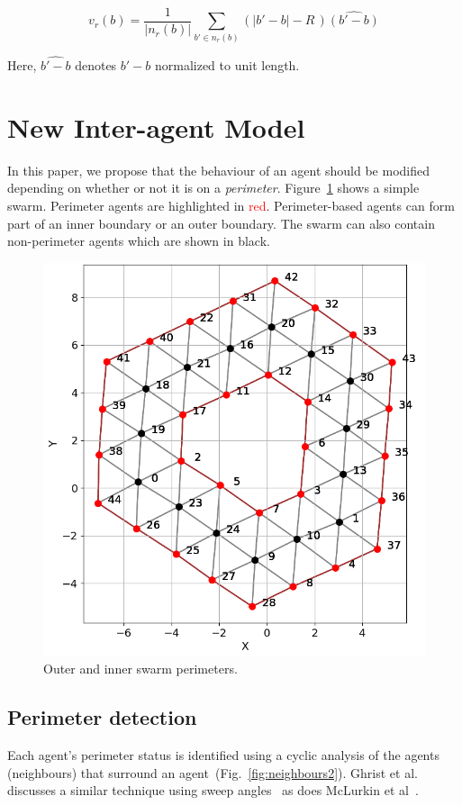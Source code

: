 \documentclass[12pt,a4paper]{IEEEtran}
\newcommand{\card}[1]{\vert{#1}\vert}
\newcommand{\vbb}[2]{#2-#1}
\begin{document}
\begin{equation}\label{eq:repulsion2a}
v_r(b) = \frac{1}{\card{n_r(b)}}\sum_{b' \in n_r(b)} \left(\card{\vbb{b}{b'}} - R \, \right)\widehat{\left(\vbb{b}{b'}\right)}
\end{equation}

Here, $\widehat{\vbb{b}{b'}}$ denotes $\vbb{b}{b'}$ normalized to unit length.

\section{New Inter-agent Model}
In this paper, we propose that the behaviour of an agent should be modified depending on whether or not it is on a \emph{perimeter}. Figure~\ref{fig:simplePerim2} shows a simple swarm. Perimeter agents are highlighted in \textcolor{red}{red}. Perimeter-based agents can form part of an inner boundary or an outer boundary. The swarm can also contain non-perimeter agents which are shown in black.

\begin{figure}[H]
	\begin{center}
		\includegraphics[width=0.8\linewidth]{figures/relationships2}
	\end{center}
	\caption{Outer and inner swarm perimeters. \label{fig:simplePerim2}}
\end{figure}

\subsection{Perimeter detection}\label{sec:perimeterDetection} 
Each agent's perimeter status is identified using a cyclic analysis of the agents (neighbours) that surround an agent~(Fig.~\ref{fig:neighbours2}). Ghrist et al. discusses a similar technique using sweep angles~\cite{ghrist2008surrounding} as does McLurkin et al~\cite{mclurkin2009}. 
\end{document}

